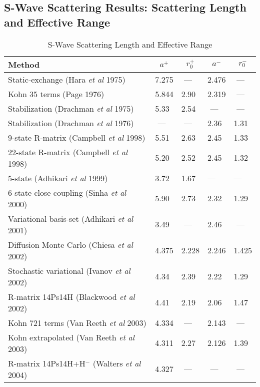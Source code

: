 \documentclass[Dissertation.tex]{subfiles}
\begin{document}
\subsection{S-Wave Scattering Results: Scattering Length and Effective Range}
\begin{table}[H]
\begin{center}
\begin{tabular}{l l l l l}
\toprule
Method & \multicolumn{1}{c}{$a^+$} & \multicolumn{1}{c}{$r_0^+$} & \multicolumn{1}{c}{$a^-$} & \multicolumn{1}{c}{$r_0^-$}\\
\midrule
Static-exchange (Hara \emph{et al} 1975) \cite{Hara1975} & 7.275 & \,\,--- & 2.476 & \,\,--- \\
Kohn 35 terms (Page 1976) \cite{Page1976} & 5.844 & 2.90 & 2.319 & \,\,--- \\
Stabilization (Drachman \emph{et al} 1975) \cite{Drachman1975} & 5.33 & 2.54 & \,\,--- & \,\,--- \\
Stabilization (Drachman \emph{et al} 1976) \cite{Drachman1976} & \,\,--- & \,\,--- & 2.36 & 1.31 \\
9-state R-matrix (Campbell \emph{et al} 1998) \cite{Campbell1998} & 5.51 & 2.63 & 2.45 & 1.33 \\
22-state R-matrix (Campbell \emph{et al} 1998) \cite{Campbell1998} & 5.20 & 2.52 & 2.45 & 1.32 \\
5-state (Adhikari \emph{et al} 1999) \cite{Adhikari1999} & 3.72 & 1.67 & --- & --- \\
6-state close coupling (Sinha \emph{et al} 2000) \cite{Sinha2000} & 5.90 & 2.73 & 2.32 & 1.29 \\
Variational basis-set (Adhikari \emph{et al} 2001) \cite{Adhikari2001b} & 3.49 & \,\,--- & 2.46 & \,\,--- \\
Diffusion Monte Carlo (Chiesa \emph{et al} 2002) \cite{Chiesa2002} & 4.375 & 2.228 & 2.246 & 1.425 \\
Stochastic variational (Ivanov \emph{et al} 2002) \cite{Ivanov2002} & 4.34 & 2.39 & 2.22 & 1.29 \\
R-matrix 14Ps14H (Blackwood \emph{et al} 2002) \cite{Blackwood2002} & 4.41 & 2.19 & 2.06 & 1.47 \\
Kohn 721 terms (Van Reeth \emph{et al} 2003) \cite{VanReeth2003} & 4.334 & \,\,--- & 2.143 & \,\,--- \\
Kohn extrapolated (Van Reeth \emph{et al} 2003) \cite{VanReeth2003} & 4.311 & 2.27 & 2.126 & 1.39 \\
R-matrix 14Ps14H+H$^-$ (Walters \emph{et al} 2004) \cite{Blackwood2002} & 4.327 & \,\,--- & \,\,--- & \,\,--- \\
\bottomrule
\end{tabular}
\caption{S-Wave Scattering Length and Effective Range}
\label{tab:SWaveScatLenOther}
\end{center}
\end{table}
\end{document}
